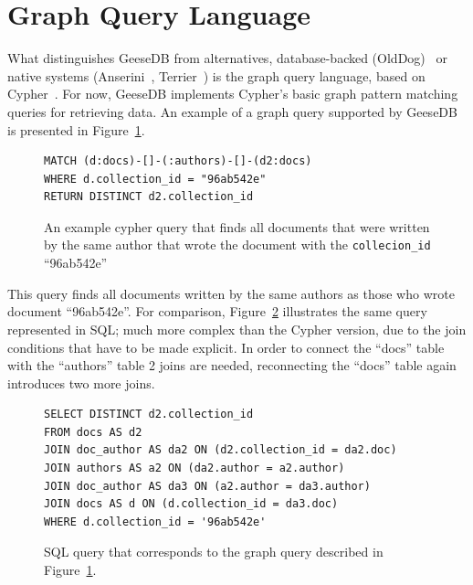 \section{Graph Query Language}
What distinguishes GeeseDB from alternatives, database-backed (OldDog)~\cite{olddog-docker} or native systems (Anserini~\cite{anserini}, Terrier~\cite{terrier}) is the graph query language, based on Cypher~\cite{cypher}. 
For now, GeeseDB implements Cypher's basic graph pattern matching queries for retrieving data. An example of a graph query supported by GeeseDB is presented in Figure~\ref{fig:graph_query}.
\begin{figure}
	\begin{verbatim}
MATCH (d:docs)-[]-(:authors)-[]-(d2:docs)
WHERE d.collection_id = "96ab542e"
RETURN DISTINCT d2.collection_id
	\end{verbatim}
	\caption{An example cypher query that finds all documents that were written by the same author that wrote the document with the \texttt{collecion\_id} ``96ab542e''}
	\label{fig:graph_query}
\end{figure}
This query finds all documents written by the same authors as those who wrote document ``96ab542e''. For comparison, Figure~\ref{fig:corresponding_sql} illustrates the same query represented in SQL; much more complex than the Cypher version, due to the join conditions that have to be made explicit. In order to connect the ``docs'' table with the ``authors'' table 2 joins are needed, reconnecting the ``docs'' table again introduces two more joins.

\begin{figure}
	\begin{verbatim}
SELECT DISTINCT d2.collection_id
FROM docs AS d2
JOIN doc_author AS da2 ON (d2.collection_id = da2.doc)
JOIN authors AS a2 ON (da2.author = a2.author)
JOIN doc_author AS da3 ON (a2.author = da3.author)
JOIN docs AS d ON (d.collection_id = da3.doc)
WHERE d.collection_id = '96ab542e'
	\end{verbatim}
	\caption{SQL query that corresponds to the graph query described in Figure~\ref{fig:graph_query}.}
	\label{fig:corresponding_sql}
\end{figure}

